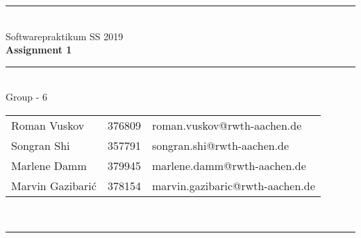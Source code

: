 \documentclass[a4paper,12pt]{article}
\begin{document}
\begin{center}
	\rule{\textwidth}{0.1pt}\\[1cm]
	
	\Large Softwarepraktikum SS 2019\\\bf Assignment 1
\end{center}


\begin{center}

	\rule{\textwidth}{0.1pt}\\[0.5cm]

	{\Large Group - 6\\[5mm]}

	\begin{tabular}{lll}

		Roman Vuskov & 376809 & roman.vuskov@rwth-aachen.de \\

		Songran Shi & 357791 & songran.shi@rwth-aachen.de \\

		Marlene Damm & 379945 & marlene.damm@rwth-aachen.de \\
		
		Marvin Gazibarić & 378154 & marvin.gazibaric@rwth-aachen.de \\

	\end{tabular}\\[0.5cm]

	\rule{\textwidth}{0.1pt}\\[1cm]

\end{center}



\end{document}
